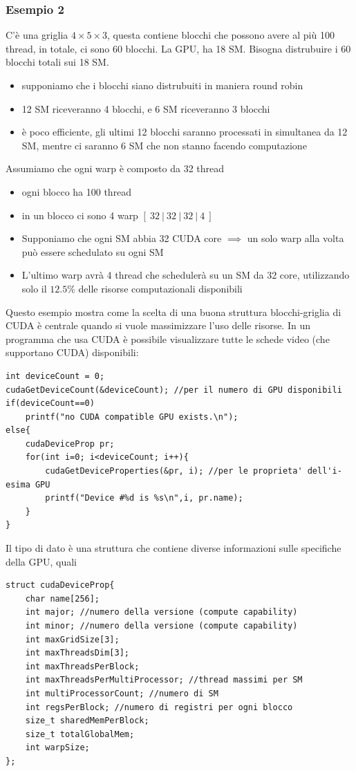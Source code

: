 \documentclass[10pt, letterpaper]{report}
\begin{document}
\subsubsection{Esempio 2}
C'è una griglia $4\times 5 \times 3$, questa contiene blocchi che possono avere al più 100 thread, in totale, ci sono 60 blocchi. La GPU, ha 18 SM. Bisogna distrubuire i 60 blocchi totali sui 18 SM. \begin{itemize}
    \item supponiamo che i blocchi siano distrubuiti in maniera round robin 
    \item 12 SM riceveranno 4 blocchi, e 6 SM riceveranno 3 blocchi 
    \item è poco efficiente, gli ultimi 12 blocchi saranno processati in simultanea da 12 SM, mentre ci saranno 6 SM che non stanno facendo computazione 
\end{itemize}
Assumiamo che ogni warp è composto da 32 thread \begin{itemize}
    \item ogni blocco ha 100 thread 
    \item in un blocco ci sono 4 warp $[\ 32\ | \ 32\ | \  32\ | \  4\ ]$
    \item Supponiamo che ogni SM abbia 32 CUDA core $\implies$ un solo warp alla volta può essere schedulato su ogni SM 
    \item L'ultimo warp avrà 4 thread che schedulerà su un SM da 32 core, utilizzando solo il $12.5\%$ delle risorse computazionali disponibili 
\end{itemize}
Questo esempio mostra come la scelta di una buona struttura blocchi-griglia di CUDA è centrale quando si vuole massimizzare l'uso delle risorse. 
In un programma che usa CUDA è possibile visualizzare tutte le schede video (che supportano CUDA) disponibili:
\begin{lstlisting}[style=CStyle]
int deviceCount = 0; 
cudaGetDeviceCount(&deviceCount); //per il numero di GPU disponibili 
if(deviceCount==0)
    printf("no CUDA compatible GPU exists.\n");
else{
    cudaDeviceProp pr;
    for(int i=0; i<deviceCount; i++){
        cudaGetDeviceProperties(&pr, i); //per le proprieta' dell'i-esima GPU
        printf("Device #%d is %s\n",i, pr.name);
    }
}
\end{lstlisting}
Il tipo di dato  è una struttura che contiene diverse informazioni sulle specifiche della GPU, quali
\begin{lstlisting}[style=CStyle]
struct cudaDeviceProp{
    char name[256];
    int major; //numero della versione (compute capability)
    int minor; //numero della versione (compute capability) 
    int maxGridSize[3];
    int maxThreadsDim[3];
    int maxThreadsPerBlock;
    int maxThreadsPerMultiProcessor; //thread massimi per SM 
    int multiProcessorCount; //numero di SM 
    int regsPerBlock; //numero di registri per ogni blocco 
    size_t sharedMemPerBlock;
    size_t totalGlobalMem;
    int warpSize;
};
\end{lstlisting}
\flowerLine 
\end{document}
